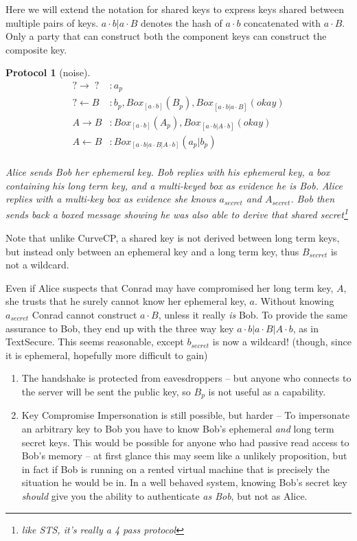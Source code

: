 \documentclass[12pt]{article}
\newtheorem{proto}{Protocol}
\begin{document}
Here we will extend the notation for shared keys to express keys shared
between multiple pairs of keys. $a \cdot b | a \cdot B$ denotes
the hash of $a \cdot b$ concatenated with $a \cdot B$. Only a party
that can construct both the component keys can construct the composite
key.

\begin{proto}[noise]

  $$
  \begin{align*}
      ? \to \;?\; &: a_{p} \\
      ? \gets B &: b_{p}, Box_{[a\cdot b]}(B_{p}), Box_{[a\cdot b|a\cdot B]}(okay) \\
      A \to B &: Box_{[a\cdot b]}(A_{p}), Box_{[a\cdot b|A\cdot b]}(okay) \\
      A \gets B &: Box_{[a \cdot b | a \cdot B | A \cdot b]}(a_{p}|b_{p})\\
  \end{align*}
  $$

  Alice sends Bob her ephemeral key. Bob replies with his ephemeral key,
  a box containing his long term key, and a multi-keyed box as
  evidence he is Bob. Alice replies with
  a multi-key box as evidence she knows $a_{secret}$ and $A_{secret}$.
  Bob then sends back a boxed message showing he was also able
  to derive that shared secret\footnote{
    like STS, it's really a 4 pass protocol
  }

\end{proto}

Note that unlike CurveCP, a shared key is not derived between long term
 keys, but instead only between an ephemeral key and a long term key,
thus $B_{secret}$ is not a wildcard.

Even if Alice suspects that Conrad may have compromised her long term
key, $A$, she trusts that he surely cannot know her ephemeral key, $a$.
Without knowing $a_{secret}$ Conrad cannot construct $a\cdot B$, unless
it really \emph{is} Bob. To provide the same assurance to Bob,
they end up with the three way key $a \cdot b | a \cdot B | A \cdot b$,
as in TextSecure\cite{textsecure}. This seems reasonable,
except $b_{secret}$ is now a wildcard! (though, since it is ephemeral,
hopefully more difficult to gain)

\begin{enumerate}
  \item The handshake is protected from eavesdroppers -- but
  anyone who connects to the server will be sent the public key,
  so $B_p$ is not useful as a capability.

  \item Key Compromise Impersonation is still possible, but harder -- To impersonate an
  arbitrary key to Bob you have to know Bob's ephemeral \emph{and} long
  term secret keys. This would be possible for anyone who had
  passive read access to Bob's memory -- at first
  glance this may seem like a unlikely proposition, but in fact
  if Bob is running on a rented virtual machine that
  is precisely the situation he would be in.
  In a well behaved system, knowing Bob's secret key \emph{should}
  give you the ability to authenticate \emph{as Bob}, but not as Alice.
\end{enumerate}
\end{document}
